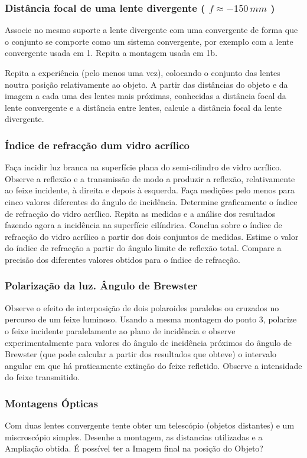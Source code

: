 \documentclass[a4paper,12pt]{article}      %
\begin{document}
\subsubsection{\sf   Distância focal de uma lente divergente ( $f  ≈  -150\, mm$ ) }
Associe  no  mesmo  suporte  a  lente  divergente  com  uma  convergente  de  forma  que  o 
conjunto se comporte como um sistema convergente, por exemplo com a lente convergente 
usada em 1. Repita a montagem usada em 1b. 

Repita a experiência (pelo menos uma vez), colocando o conjunto das lentes noutra posição 
relativamente ao objeto. 
A  partir  das  distâncias  do  objeto  e  da  imagem  a  cada  uma  des  lentes  mais  próximas, 
conhecidas  a  distância  focal  da  lente  convergente  e  a  distância  entre  lentes,  calcule  a 
distância focal da lente divergente. 

\subsubsection{\sf  Índice de refracção dum vidro acrílico }

Faça  incidir  luz  branca  na  superfície  plana  do  semi-cilindro  de  vidro  acrílico.  Observe  a 
reflexão e a transmissão de modo a produzir a reflexão, relativamente ao feixe incidente, à 
direita  e  depois  à  esquerda.  Faça  medições  pelo  menos  para  cinco  valores  diferentes  do 
ângulo de incidência. Determine graficamente o índice de refracção do vidro acrílico.  
Repita  as  medidas  e  a  análise  dos  resultados  fazendo  agora  a  incidência  na  superfície 
cilíndrica. Conclua sobre o índice de refracção do vidro acrílico a partir dos dois conjuntos 
de medidas. 
Estime o valor do índice de refracção a partir do ângulo limite de reflexão total. 
Compare a precisão dos diferentes valores obtidos para o índice de refracção. 

\subsubsection{\sf Polarização da luz. Ângulo de Brewster}
Observe o efeito de interposição de dois polaroides paralelos ou cruzados no percurso de 
um feixe luminoso. 
Usando a mesma montagem do ponto 3, polarize o feixe incidente paralelamente ao plano
de incidência e observe experimentalmente para valores do ângulo de incidência próximos 
do  ângulo  de  Brewster  (que  pode  calcular  a  partir  dos  resultados  que  obteve)  o  intervalo 
angular em que há praticamente extinção do feixe refletido. Observe a intensidade do feixe 
transmitido. 

\subsubsection{\sf Montagens Ópticas}
Com duas lentes convergente tente obter um telescópio (objetos distantes) e um miscroscópio simples. Desenhe a montagem, as distancias utilizadas e a Ampliação obtida.
É possível ter a Imagem final na posição do Objeto?
\end{document}
